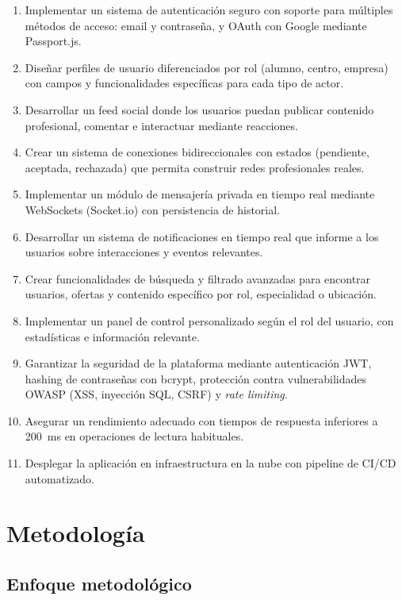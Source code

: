 \documentclass[a4paper]{report}
\begin{document}
\begin{enumerate}
  \item Implementar un sistema de autenticación seguro con soporte para múltiples métodos de acceso: email y contraseña, y OAuth con Google mediante Passport.js.
  \item Diseñar perfiles de usuario diferenciados por rol (alumno, centro, empresa) con campos y funcionalidades específicas para cada tipo de actor.
  \item Desarrollar un feed social donde los usuarios puedan publicar contenido profesional, comentar e interactuar mediante reacciones.
  \item Crear un sistema de conexiones bidireccionales con estados (pendiente, aceptada, rechazada) que permita construir redes profesionales reales.
  \item Implementar un módulo de mensajería privada en tiempo real mediante WebSockets (Socket.io) con persistencia de historial.
  \item Desarrollar un sistema de notificaciones en tiempo real que informe a los usuarios sobre interacciones y eventos relevantes.
  \item Crear funcionalidades de búsqueda y filtrado avanzadas para encontrar usuarios, ofertas y contenido específico por rol, especialidad o ubicación.
  \item Implementar un panel de control personalizado según el rol del usuario, con estadísticas e información relevante.
  \item Garantizar la seguridad de la plataforma mediante autenticación JWT, hashing de contraseñas con bcrypt, protección contra vulnerabilidades OWASP (XSS, inyección SQL, CSRF) y \textit{rate limiting}.
  \item Asegurar un rendimiento adecuado con tiempos de respuesta inferiores a 200~ms en operaciones de lectura habituales.
  \item Desplegar la aplicación en infraestructura en la nube con pipeline de CI/CD automatizado.
\end{enumerate}

\newpage

\chapter{Metodología}

\section{Enfoque metodológico}
\end{document}
